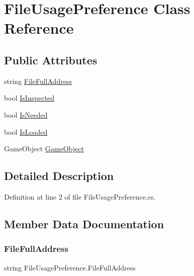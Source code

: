 \hypertarget{class_file_usage_preference}{}\section{File\+Usage\+Preference Class Reference}
\label{class_file_usage_preference}
\subsection*{Public Attributes}
\begin{DoxyCompactItemize}
\item 
string \mbox{\hyperlink{class_file_usage_preference_acc6b06a21675825a267f4339abb17139}{File\+Full\+Address}}
\item 
bool \mbox{\hyperlink{class_file_usage_preference_a43d76051845a1b45f5f78f83069ccb9e}{Is\+Inspected}}
\item 
bool \mbox{\hyperlink{class_file_usage_preference_ab77a6aa7c4fb2f733c9568eb9a34d38c}{Is\+Needed}}
\item 
bool \mbox{\hyperlink{class_file_usage_preference_aabdc15d32f9897e75e6db8a34af43515}{Is\+Loaded}}
\item 
Game\+Object \mbox{\hyperlink{class_file_usage_preference_a1ccc8bac7642cb88370c9232502d99ed}{Game\+Object}}
\end{DoxyCompactItemize}


\subsection{Detailed Description}


Definition at line 2 of file File\+Usage\+Preference.\+cs.



\subsection{Member Data Documentation}
\mbox{\label{class_file_usage_preference_acc6b06a21675825a267f4339abb17139}} 
\subsubsection{\texorpdfstring{FileFullAddress}{FileFullAddress}}
{\footnotesize\ttfamily string File\+Usage\+Preference.\+File\+Full\+Address}



